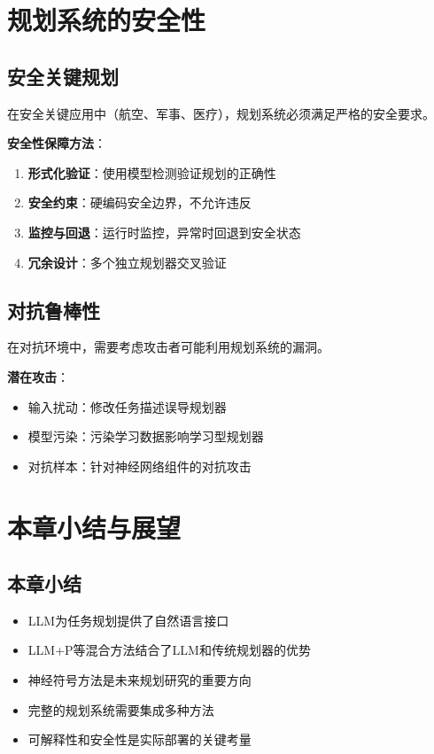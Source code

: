 \section{规划系统的安全性}

\subsection{安全关键规划}

在安全关键应用中（航空、军事、医疗），规划系统必须满足严格的安全要求。

\textbf{安全性保障方法}：
\begin{enumerate}[leftmargin=2em]
  \item \textbf{形式化验证}：使用模型检测验证规划的正确性
  \item \textbf{安全约束}：硬编码安全边界，不允许违反
  \item \textbf{监控与回退}：运行时监控，异常时回退到安全状态
  \item \textbf{冗余设计}：多个独立规划器交叉验证
\end{enumerate}

\subsection{对抗鲁棒性}

在对抗环境中，需要考虑攻击者可能利用规划系统的漏洞。

\textbf{潜在攻击}：
\begin{itemize}[leftmargin=2em]
  \item 输入扰动：修改任务描述误导规划器
  \item 模型污染：污染学习数据影响学习型规划器
  \item 对抗样本：针对神经网络组件的对抗攻击
\end{itemize}

\section{本章小结与展望}

\subsection*{本章小结}

\begin{itemize}[leftmargin=2em]
  \item LLM为任务规划提供了自然语言接口
  \item LLM+P等混合方法结合了LLM和传统规划器的优势
  \item 神经符号方法是未来规划研究的重要方向
  \item 完整的规划系统需要集成多种方法
  \item 可解释性和安全性是实际部署的关键考量
\end{itemize}

